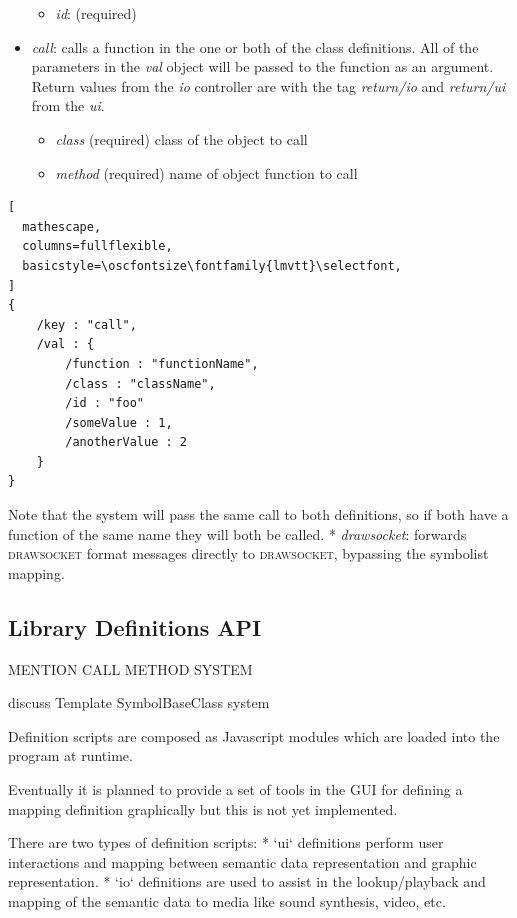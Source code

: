 \documentclass{article}
\def\drawsocket{\textsc{drawsocket}\xspace}
\def\oscfontsize{\footnotesize}
\begin{document}
\begin{itemize}
\begin{itemize}\itemsep0pt 
  \item \textit{id}: (required)
\end{itemize}
\item \textit{call}: calls a function in the one or both of the class definitions. All of the parameters in the \textit{val} object will be passed to the function as an argument. Return values from the \textit{io} controller are with the tag \textit{return/io} and \textit{return/ui} from the \textit{ui}.
\begin{itemize}\itemsep0pt 
  \item \textit{class} (required) class of the object to call
  \item \textit{method} (required) name of object function to call
\end{itemize}

\end{itemize}

\begin{lstlisting}[
  mathescape,
  columns=fullflexible,
  basicstyle=\oscfontsize\fontfamily{lmvtt}\selectfont,
]
{
    /key : "call",
    /val : {
        /function : "functionName",
        /class : "className",
        /id : "foo"
        /someValue : 1,
        /anotherValue : 2
    }
}
\end{lstlisting}

Note that the system will pass the same call to both definitions, so if both have a function of the same name they will both be called.
* \textit{drawsocket}: forwards \drawsocket format messages directly to \drawsocket, bypassing the symbolist mapping.


\subsection{Library Definitions API}\label{library_definitions_api}

MENTION CALL METHOD SYSTEM	


discuss Template SymbolBaseClass system


Definition scripts are composed as Javascript modules which are loaded into the program at runtime.

Eventually it is planned to provide a set of tools in the GUI for defining a mapping definition graphically but this is not yet implemented.

There are two types of definition scripts:
* `ui` definitions perform user interactions and mapping between semantic data representation and graphic representation.
* `io` definitions are used to assist in the lookup/playback and mapping of the semantic data to media like sound synthesis, video, etc.
\end{document}
